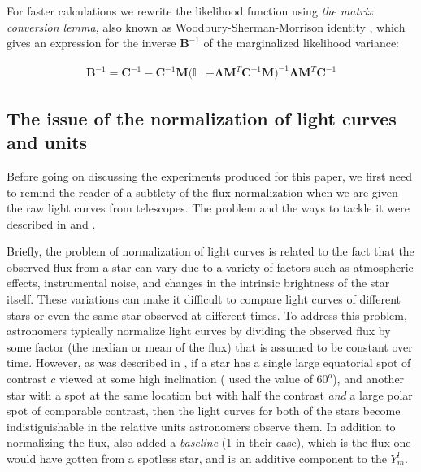 \documentclass[twocolumn]{aastex631}
\begin{document}
For faster calculations we rewrite the likelihood function using \emph{the matrix conversion lemma}, also known as 
Woodbury-Sherman-Morrison identity \citep[see, e.g.,][]{Hogg2020}, which gives an expression for the inverse $\pmb{B}^{-1}$ of the marginalized likelihood variance:
%
\begin{linenomath}\begin{align}
    \label{eq:Hoggtrick}
    \pmb{B}^{-1} = \pmb{C}^{-1} - \pmb{C}^{-1} \pmb{M} (\pmb{\mathbb{I}} 
    & + \pmb{\Lambda} \pmb{M}^T \pmb{C}^{-1}\pmb{M})^{-1}\pmb{\Lambda} \pmb{M}^T\pmb{C}^{-1}
\end{align}\end{linenomath}
%


\subsection{The issue of the normalization of light curves and units}
Before going on discussing the experiments produced for this paper, we first need to remind the reader of a subtlety of the flux normalization when we are given
the raw light curves from telescopes. The problem and the ways to tackle it were described in \cite{Luger2021a} and \cite{Luger2021b}. 

Briefly, the problem of normalization of light curves is related to the fact that the observed flux from a star can vary due to a variety of factors 
such as atmospheric effects, instrumental noise, and changes in the intrinsic brightness of the star itself. These variations can make it difficult 
to compare light curves of different stars or even the same star observed at different times. To address this problem, astronomers typically normalize 
light curves by dividing the observed flux by some factor (the median or mean of the flux) that is assumed to be constant over time. 
However, as was described in \cite{Luger2021a}, if a star has a single large equatorial spot of contrast $c$ viewed at some high inclination 
(\cite{Luger2021a} used the value of $60^o$), and another star with a spot at the same location but with half the contrast \emph{and} a large polar spot of 
comparable contrast, then the light curves for both of the stars become indistiguishable in the relative units astronomers observe them. In addition to normalizing 
the flux, \cite{Luger2021a} also added a \emph{baseline} (1 in their case), which is the flux one would have gotten from a spotless star, 
and is an additive component to the $Y_m^l$.
\end{document}
